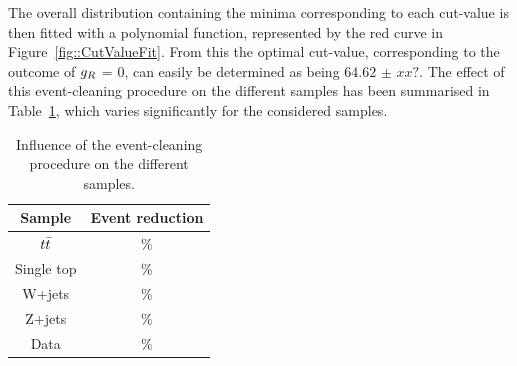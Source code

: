 The overall distribution containing the minima corresponding to each cut-value is then fitted with a polynomial function, represented by the red curve in Figure~\ref{fig::CutValueFit}.
From this the optimal cut-value, corresponding to the outcome of $g_{R}$ = 0, can easily be determined as being $64.62$ $\pm$ $xx?$.
The effect of this event-cleaning procedure on the different samples has been summarised in Table~\ref{table::CutInfl}, which varies significantly for the considered samples.
\\
\begin{table}[h!t]
 \centering
 \caption{Influence of the event-cleaning procedure on the different samples.} \label{table::CutInfl}
 \renewcommand{\arraystretch}{1.2}
 \begin{tabular}{c|c}
  Sample 	& Event reduction 	\\
  \hline
  $t\bar{t}$ 	& $\%$ 			\\
  Single top 	& $\%$ 			\\
  W+jets 	& $\%$ 			\\
  Z+jets 	& $\%$ 			\\
  \hline
  Data 		& $\%$ 			
 \end{tabular}
\end{table}


